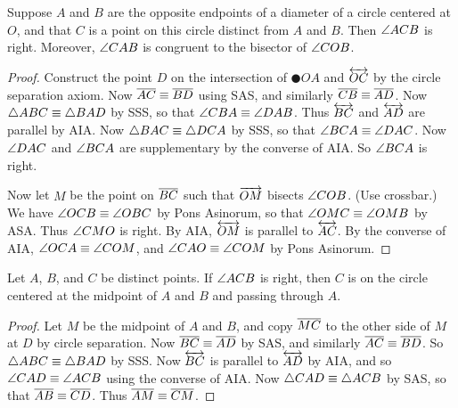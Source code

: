 \begin{prop}
Suppose \(A\) and \(B\) are the opposite endpoints of a diameter of a circle centered at \(O\), and that \(C\) is a point on this circle distinct from \(A\) and \(B\).
Then \(\angle{ACB}\) is right.
Moreover, \(\angle{CAB}\) is congruent to the bisector of \(\angle{COB}\).
\end{prop}

\begin{proof}
Construct the point \(D\) on the intersection of \(\CIRCLE{O}{A}\) and \(\overleftrightarrow{OC}\) by the circle separation axiom.
Now \(\overline{AC} \equiv \overline{BD}\) using SAS, and similarly \(\overline{CB} \equiv \overline{AD}\).
Now \(\bigtriangleup{ABC} \equiv \bigtriangleup{BAD}\) by SSS, so that \(\angle{CBA} \equiv \angle{DAB}\).
Thus \(\overleftrightarrow{BC}\) and \(\overleftrightarrow{AD}\) are parallel by AIA.
Now \(\bigtriangleup{BAC} \equiv \bigtriangleup{DCA}\) by SSS, so that \(\angle{BCA} \equiv \angle{DAC}\).
Now \(\angle{DAC}\) and \(\angle{BCA}\) are supplementary by the converse of AIA.
So \(\angle{BCA}\) is right.

Now let \(M\) be the point on \(\overline{BC}\) such that \(\overrightarrow{OM}\) bisects \(\angle{COB}\).
(Use crossbar.)
We have \(\angle{OCB} \equiv \angle{OBC}\) by Pons Asinorum, so that \(\angle{OMC} \equiv \angle{OMB}\) by ASA.
Thus \(\angle{CMO}\) is right.
By AIA, \(\overleftrightarrow{OM}\) is parallel to \(\overleftrightarrow{AC}\).
By the converse of AIA, \(\angle{OCA} \equiv \angle{COM}\), and \(\angle{CAO} \equiv \angle{COM}\) by Pons Asinorum.
\end{proof}

\begin{prop}
Let \(A\), \(B\), and \(C\) be distinct points.
If \(\angle{ACB}\) is right, then \(C\) is on the circle centered at the midpoint of \(A\) and \(B\) and passing through \(A\).
\end{prop}

\begin{proof}
Let \(M\) be the midpoint of \(A\) and \(B\), and copy \(\overline{MC}\) to the other side of \(M\) at \(D\) by circle separation.
Now \(\overline{BC} \equiv \overline{AD}\) by SAS, and similarly \(\overline{AC} \equiv \overline{BD}\).
So \(\bigtriangleup{ABC} \equiv \bigtriangleup{BAD}\) by SSS.
Now \(\overleftrightarrow{BC}\) is parallel to \(\overleftrightarrow{AD}\) by AIA, and so \(\angle{CAD} \equiv \angle{ACB}\) using the converse of AIA.
Now \(\bigtriangleup{CAD} \equiv \bigtriangleup{ACB}\) by SAS, so that \(\overline{AB} \equiv \overline{CD}\).
Thus \(\overline{AM} \equiv \overline{CM}\).
\end{proof}

